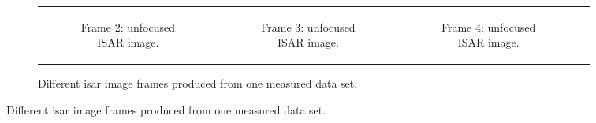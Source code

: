 \documentclass[class=report,11pt,crop=false]{standalone}
\begin{document}
\begin{figure}[h]
\begin{minipage}{0.9\linewidth}
\begin{figure}
\begin{tabular}{@{}cccc@{}}
\begin{subfigure}{0.25\linewidth}
                        \resizebox{\linewidth}{!}{}
                        \caption{Frame 2: unfocused ISAR image.}
                    \end{subfigure}
                    &
                    \begin{subfigure}{0.25\linewidth}
                        \centering
                        \resizebox{\linewidth}{!}{}
                         \caption{Frame 3: unfocused ISAR image.}
                    \end{subfigure}
                    &
                    \begin{subfigure}{0.25\linewidth}
                        \centering
                        \resizebox{\linewidth}{!}{}
                         \caption{Frame 4: unfocused ISAR image.}
                    \end{subfigure}
                \end{tabular}
                \caption{Different \gls{isar} image frames produced from one measured data set. \label{fig:measured_data_frames}}
            \end{figure}
        \end{minipage}
    \end{figure}
\end{document}
